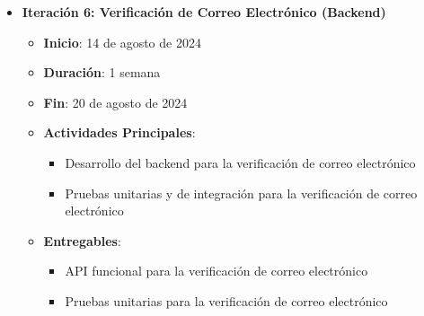 \begin{itemize}
\begin{itemize}
              \item \textbf{Iteración 6: Verificación de Correo Electrónico (Backend)}
                    \begin{itemize}
                        \item \textbf{Inicio}: 14 de agosto de 2024
                        \item \textbf{Duración}: 1 semana
                        \item \textbf{Fin}: 20 de agosto de 2024
                        \item \textbf{Actividades Principales}:
                              \begin{itemize}
                                  \item Desarrollo del backend para la verificación de correo electrónico
                                  \item Pruebas unitarias y de integración para la verificación de correo electrónico
                              \end{itemize}
                        \item \textbf{Entregables}:
                              \begin{itemize}
                                  \item API funcional para la verificación de correo electrónico
                                  \item Pruebas unitarias para la verificación de correo electrónico
                              \end{itemize}
                    \end{itemize}
          \end{itemize}


\end{itemize}
